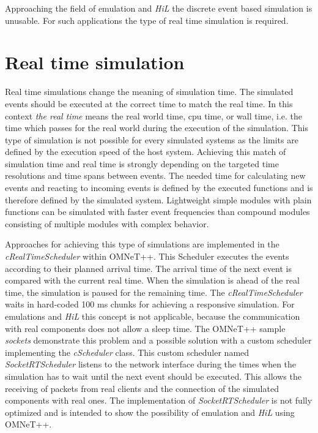 Approaching the field of emulation and \emph{HiL} the discrete event based simulation is unusable.
For such applications the type of real time simulation is required.

\section{Real time simulation}
\label{sec:RealTimeSimulation}
Real time simulations change the meaning of simulation time.
The simulated events should be executed at the correct time to match the real time.
In this context \emph{the real time} means the real world time, cpu time, or wall time, i.e. the time which passes for the real world during the execution of the simulation.
This type of simulation is not possible for every simulated systems as the limits are defined by the execution speed of the host system.
Achieving this match of simulation time and real time is strongly depending on the targeted time resolutions and time spans between events.
The needed time for calculating new events and reacting to incoming events is defined by the executed functions and is therefore defined by the simulated system.
Lightweight simple modules with plain functions can be simulated with faster event frequencies than compound modules consisting of multiple modules with complex behavior.

Approaches for achieving this type of simulations are implemented in the \emph{cRealTimeScheduler} within OMNeT++.
This Scheduler executes the events according to their planned arrival time.
The arrival time of the next event is compared with the current real time.
When the simulation is ahead of the real time, the simulation is paused for the remaining time.
The \emph{cRealTimeScheduler} waits in hard-coded 100 ms chunks for achieving a responsive simulation.
For emulations and \emph{HiL} this concept is not applicable, because the communication with real components does not allow a sleep time.
The OMNeT++ sample \emph{sockets} demonstrate this problem and a possible solution with a custom scheduler implementing the \emph{cScheduler} class.
This custom scheduler named \emph{SocketRTScheduler} listens to the network interface during the times when the simulation has to wait until the next event should be executed.
This allows the receiving of packets from real clients and the connection of the simulated components with real ones.
The implementation of \emph{SocketRTScheduler} is not fully optimized and is intended to show the possibility of emulation and \emph{HiL} using OMNeT++.

